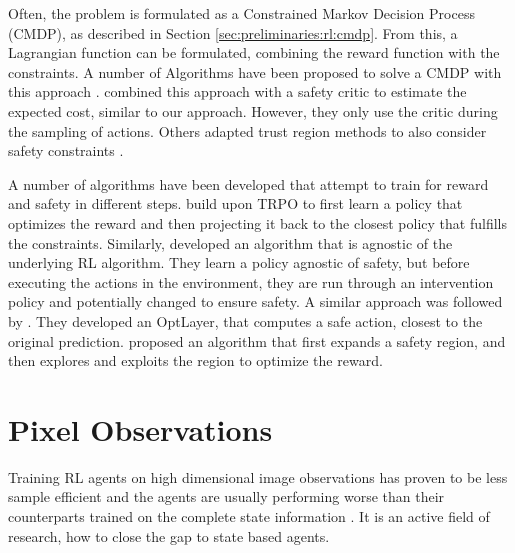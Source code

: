 Often, the problem is formulated as a Constrained Markov Decision Process (CMDP), as described in Section \ref{sec:preliminaries:rl:cmdp}. From this, a Lagrangian function can be formulated, combining the reward function with the constraints. A number of Algorithms have been proposed to solve a CMDP with this approach \cite{borkarActorcriticAlgorithmConstrained2005, yuConvergentPolicyOptimization2019, tesslerRewardConstrainedPolicy2018, paternainConstrainedReinforcementLearning2019, paternainSafePoliciesReinforcement2022}. \citeauthor{bharadhwajConservativeSafetyCritics2021} \cite{bharadhwajConservativeSafetyCritics2021} combined this approach with a safety critic to estimate the expected cost, similar to our approach. However, they only use the critic during the sampling of actions. Others adapted trust region methods to also consider safety constraints \cite{achiamConstrainedPolicyOptimization2017}. 

A number of algorithms have been developed that attempt to train for reward and safety in different steps. \citeauthor{yangProjectionBasedConstrainedPolicy2020} \cite{yangProjectionBasedConstrainedPolicy2020} build upon TRPO to first learn a policy that optimizes the reward and then projecting it back to the closest policy that fulfills the constraints. Similarly, \citeauthor{wagenerSafeReinforcementLearning2021} \cite{wagenerSafeReinforcementLearning2021} developed an algorithm that is agnostic of the underlying RL algorithm. They learn a policy agnostic of safety, but before executing the actions in the environment, they are run through an intervention policy and potentially changed to ensure safety. A similar approach was followed by \citeauthor{phamOptLayerPracticalConstrained2018} \cite{phamOptLayerPracticalConstrained2018}. They developed an OptLayer, that computes a safe action, closest to the original prediction.  \citeauthor{wachiSafeReinforcementLearning2020} \cite{wachiSafeReinforcementLearning2020} proposed an algorithm that first expands a safety region, and then explores and exploits the region to optimize the reward.

\section{Pixel Observations}
\label{sec:pixelObservations}

Training RL agents on high dimensional image observations has proven to be less sample efficient and the agents are usually performing worse than their counterparts trained on the complete state information \cite{yaratsImprovingSampleEfficiency2020, kostrikovImageAugmentationAll2021, srinivasCURLContrastiveUnsupervised2020}. It is an active field of research, how to close the gap to state based agents.

